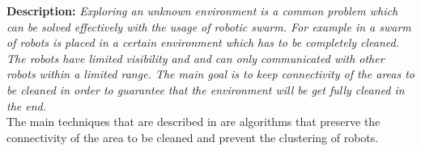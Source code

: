 
\textbf{Description: }
  \emph{Exploring an unknown environment is a common problem which can be solved effectively with the usage of robotic swarm. For example in \cite{wagner2008cooperative} a swarm of robots is placed in a certain environment which has to be completely cleaned. The robots have limited visibility and and can only communicated with other robots within a limited range. The main goal is to keep connectivity of the areas to be cleaned in order to guarantee that the environment will be get fully cleaned in the end.}\\
  The main techniques that are described in \cite{wagner2008cooperative} are algorithms that preserve the connectivity of the area to be cleaned and prevent the clustering of robots.